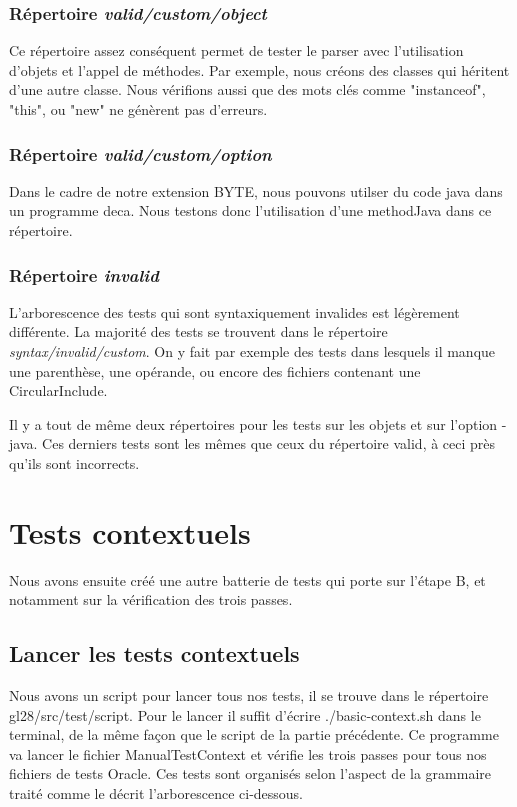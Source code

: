 \documentclass[12pt, a4paper, one side]{article}
\begin{document}
\subsubsection{Répertoire \textit{valid/custom/object}}
Ce répertoire assez conséquent permet de tester le parser avec l'utilisation d'objets et l'appel de méthodes. Par exemple, nous créons des classes qui héritent d'une autre classe. Nous vérifions aussi que des mots clés comme "instanceof", "this", ou "new" ne génèrent pas d'erreurs.

\subsubsection{Répertoire \textit{valid/custom/option}}
Dans le cadre de notre extension BYTE, nous pouvons utilser du code java dans un programme deca. Nous testons donc l'utilisation d'une methodJava dans ce répertoire.

\subsubsection{Répertoire \textit{invalid}}
L'arborescence des tests qui sont syntaxiquement invalides est légèrement différente. La majorité des tests se trouvent dans le répertoire \textit{syntax/invalid/custom}. On y fait par exemple des tests dans lesquels il manque une parenthèse, une opérande, ou encore des fichiers contenant une CircularInclude.

Il y a tout de même deux répertoires pour les tests sur les objets et sur l'option -java. Ces derniers tests sont les mêmes que ceux du répertoire valid, à ceci près qu'ils sont incorrects.


\section{Tests contextuels}
Nous avons ensuite créé une autre batterie de tests qui porte sur l'étape B, et notamment sur la vérification des trois passes.

\subsection{Lancer les tests contextuels}
Nous avons un script pour lancer tous nos tests, il se trouve dans le répertoire gl28/src/test/script. Pour le lancer il suffit d'écrire ./basic-context.sh dans le terminal, de la même façon que le script de la partie précédente. Ce programme va lancer le fichier ManualTestContext et vérifie les trois passes pour tous nos fichiers de tests Oracle. Ces tests sont organisés selon l'aspect de la grammaire traité comme le décrit l'arborescence ci-dessous.
\end{document}
